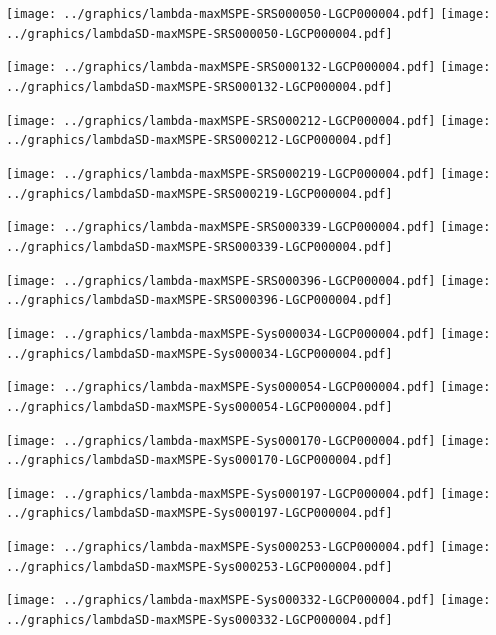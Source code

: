 \documentclass[review]{elsarticle}
\begin{document}
\texttt{[image: ../graphics/lambda-maxMSPE-SRS000050-LGCP000004.pdf]}
\texttt{[image: ../graphics/lambdaSD-maxMSPE-SRS000050-LGCP000004.pdf]}

\texttt{[image: ../graphics/lambda-maxMSPE-SRS000132-LGCP000004.pdf]}
\texttt{[image: ../graphics/lambdaSD-maxMSPE-SRS000132-LGCP000004.pdf]}

\texttt{[image: ../graphics/lambda-maxMSPE-SRS000212-LGCP000004.pdf]}
\texttt{[image: ../graphics/lambdaSD-maxMSPE-SRS000212-LGCP000004.pdf]}

\texttt{[image: ../graphics/lambda-maxMSPE-SRS000219-LGCP000004.pdf]}
\texttt{[image: ../graphics/lambdaSD-maxMSPE-SRS000219-LGCP000004.pdf]}

\texttt{[image: ../graphics/lambda-maxMSPE-SRS000339-LGCP000004.pdf]}
\texttt{[image: ../graphics/lambdaSD-maxMSPE-SRS000339-LGCP000004.pdf]}

\texttt{[image: ../graphics/lambda-maxMSPE-SRS000396-LGCP000004.pdf]}
\texttt{[image: ../graphics/lambdaSD-maxMSPE-SRS000396-LGCP000004.pdf]}

\texttt{[image: ../graphics/lambda-maxMSPE-Sys000034-LGCP000004.pdf]}
\texttt{[image: ../graphics/lambdaSD-maxMSPE-Sys000034-LGCP000004.pdf]}

\texttt{[image: ../graphics/lambda-maxMSPE-Sys000054-LGCP000004.pdf]}
\texttt{[image: ../graphics/lambdaSD-maxMSPE-Sys000054-LGCP000004.pdf]}

\texttt{[image: ../graphics/lambda-maxMSPE-Sys000170-LGCP000004.pdf]}
\texttt{[image: ../graphics/lambdaSD-maxMSPE-Sys000170-LGCP000004.pdf]}

\texttt{[image: ../graphics/lambda-maxMSPE-Sys000197-LGCP000004.pdf]}
\texttt{[image: ../graphics/lambdaSD-maxMSPE-Sys000197-LGCP000004.pdf]}

\texttt{[image: ../graphics/lambda-maxMSPE-Sys000253-LGCP000004.pdf]}
\texttt{[image: ../graphics/lambdaSD-maxMSPE-Sys000253-LGCP000004.pdf]}

\texttt{[image: ../graphics/lambda-maxMSPE-Sys000332-LGCP000004.pdf]}
\texttt{[image: ../graphics/lambdaSD-maxMSPE-Sys000332-LGCP000004.pdf]}




\end{document}
